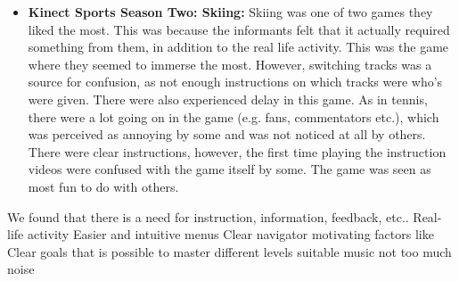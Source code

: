 \begin{itemize}
\item \textbf{Kinect Sports Season Two: Skiing:} Skiing was one of two games they liked the most. This was because the informants felt that it actually required something from them, in addition to the real life activity. This was the game where they seemed to immerse the most. However, switching tracks was a source for confusion, as not enough instructions on which tracks were who's were given. There were also experienced delay in this game. As in tennis, there were a lot going on in the game (e.g. fans, commentators etc.), which was perceived as annoying by some and was not noticed at all by others. There were clear instructions, however, the first time playing the instruction videos were confused with the game itself by some. The game was seen as most fun to do with others. 
\end{itemize}

We found that there is a need for instruction, information, feedback, etc.. 
Real-life activity
Easier and intuitive menus
Clear navigator
motivating factors like Clear goals that is possible to master
different levels
suitable music
not too much noise





